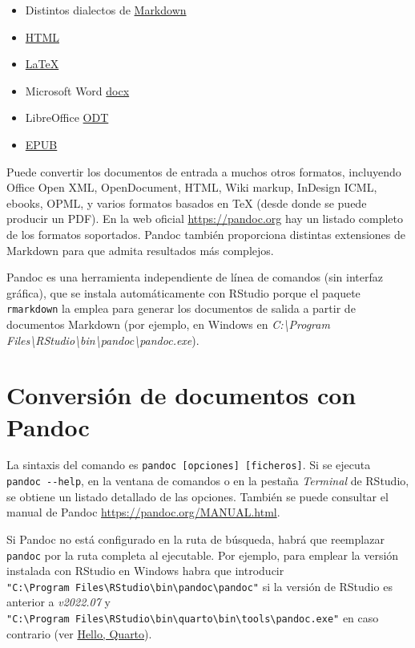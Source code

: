\documentclass[
]{book}
\theoremstyle{break}
\theoremstyle{nonumberplain}
\begin{document}
\begin{itemize}
\item
  Distintos dialectos de \href{http://daringfireball.net/projects/markdown/}{Markdown}
\item
  \href{http://www.w3.org/TR/html40/}{HTML}
\item
  \href{http://www.latex-project.org/}{LaTeX}
\item
  Microsoft Word \href{https://en.wikipedia.org/wiki/Office_Open_XML}{docx}
\item
  LibreOffice \href{http://en.wikipedia.org/wiki/OpenDocument}{ODT}
\item
  \href{http://en.wikipedia.org/wiki/EPUB}{EPUB}
\end{itemize}

Puede convertir los documentos de entrada a muchos otros formatos, incluyendo Office Open XML, OpenDocument, HTML, Wiki markup, InDesign ICML, ebooks, OPML, y varios formatos basados en TeX (desde donde se puede producir un PDF).
En la web oficial \url{https://pandoc.org} hay un listado completo de los formatos soportados.
Pandoc también proporciona distintas extensiones de Markdown para que admita resultados más complejos.

Pandoc es una herramienta independiente de línea de comandos (sin interfaz gráfica), que se instala automáticamente con RStudio porque el paquete \texttt{rmarkdown} la emplea para generar los documentos de salida a partir de documentos Markdown
(por ejemplo, en Windows en \emph{C:\textbackslash Program Files\textbackslash RStudio\textbackslash bin\textbackslash pandoc\textbackslash pandoc.exe}).

\hypertarget{conversion}{%
\section{Conversión de documentos con Pandoc}\label{conversion}}

La sintaxis del comando es \texttt{pandoc\ {[}opciones{]}\ {[}ficheros{]}}. Si se ejecuta \texttt{pandoc\ -\/-help},
en la ventana de comandos o en la pestaña \emph{Terminal} de RStudio, se obtiene un listado detallado de las opciones.
También se puede consultar el manual de Pandoc \url{https://pandoc.org/MANUAL.html}.

Si Pandoc no está configurado en la ruta de búsqueda, habrá que reemplazar \texttt{pandoc} por la ruta completa al ejecutable.
Por ejemplo, para emplear la versión instalada con RStudio en Windows habra que introducir \texttt{"C:\textbackslash{}Program\ Files\textbackslash{}RStudio\textbackslash{}bin\textbackslash{}pandoc\textbackslash{}pandoc"} si la versión de RStudio es anterior a \emph{v2022.07} y \texttt{"C:\textbackslash{}Program\ Files\textbackslash{}RStudio\textbackslash{}bin\textbackslash{}quarto\textbackslash{}bin\textbackslash{}tools\textbackslash{}pandoc.exe"} en caso contrario (ver \href{https://quarto.org/docs/get-started/hello/rstudio.html}{Hello, Quarto}).
\end{document}
